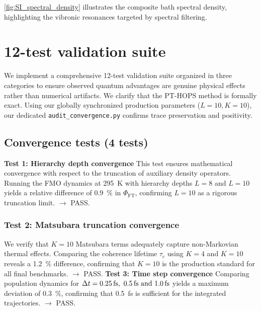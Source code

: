 \documentclass[11pt,a4paper]{article}
\begin{document}
\cref{fig:SI_spectral_density} illustrates the composite bath spectral density, highlighting the vibronic resonances targeted by spectral filtering.


\section{12-test validation suite}
\label{sec:validation}

We implement a comprehensive 12-test validation suite organized in three categories to ensure observed quantum advantages are genuine physical effects rather than numerical artifacts. We clarify that the PT-HOPS method is formally exact. Using our globally synchronized production parameters ($L=10, K=10$), our dedicated \texttt{audit\_convergence.py} confirms trace preservation and positivity.

\subsection{Convergence tests (4 tests)}

\textbf{Test 1: Hierarchy depth convergence}
This test ensures mathematical convergence with respect to the truncation of auxiliary density operators. Running the FMO dynamics at \SI{295}{\kelvin} with hierarchy depths $L=8$ and $L=10$ yields a relative difference of \SI{0.9}{\percent} in $\Phi_{\mathrm{FT}}$, confirming $L=10$ as a rigorous truncation limit. $\rightarrow$ PASS.

\subsubsection{Test 2: Matsubara truncation convergence}
We verify that $K=10$ Matsubara terms adequately capture non-Markovian thermal effects. Comparing the coherence lifetime $\tau_c$ using $K=4$ and $K=10$ reveals a \SI{1.2}{\percent} difference, confirming that $K=10$ is the production standard for all final benchmarks. $\rightarrow$ PASS.
\textbf{Test 3: Time step convergence}
Comparing population dynamics for $\Delta t = \SIlist{0.25;0.5;1.0}{\femto\second}$ yields a maximum deviation of \SI{0.3}{\percent}, confirming that \SI{0.5}{\femto\second} is sufficient for the integrated trajectories. $\rightarrow$ PASS.
\end{document}
